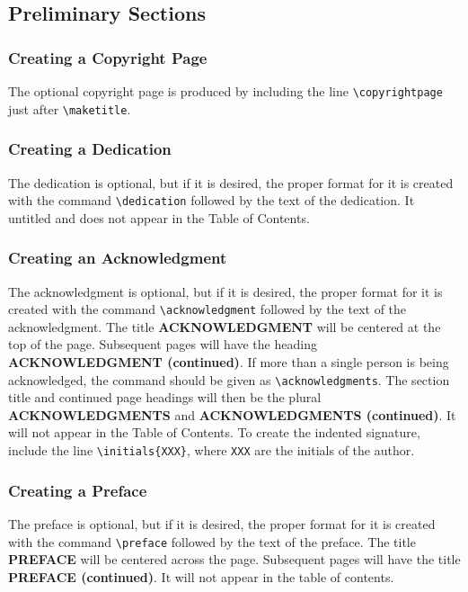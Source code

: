 \subsection{Preliminary Sections}
\subsubsection{Creating a Copyright Page}
The optional copyright page is produced by including the line
\verb+\copyrightpage+ just after \verb+\maketitle+.
 
\subsubsection{Creating a Dedication}
The dedication is optional, but if it is desired, the proper format for
it is created with the command \verb+\dedication+ followed by the
text of the dedication.
It untitled and does not appear in the Table of Contents.
 
\subsubsection{Creating an Acknowledgment}
The acknowledgment is optional, but if it is desired, the
proper format for it is created with the command \verb+\acknowledgment+
followed by the text of the acknowledgment.
The title {\bf ACKNOWLEDGMENT} will be centered at the top of the page.
Subsequent pages will have the heading {\bf ACKNOWLEDGMENT (continued)}.
If more than a single person is being acknowledged, the command should
be given as \verb+\acknowledgments+.  The section title and continued
page headings will then be the plural {\bf ACKNOWLEDGMENTS} and
{\bf ACKNOWLEDGMENTS (continued)}.
It will not appear in the Table of Contents.
To create the indented signature, include the line
\verb+\initials{XXX}+, where \verb+XXX+ are the initials of the author.
 
\subsubsection{Creating a Preface}
The preface is optional, but if it is desired, the
proper format for it is created with the command \verb+\preface+
followed by the text of the preface.
The title {\bf PREFACE} will be centered across the page.
Subsequent pages will have the title {\bf PREFACE (continued)}.
It will not appear in the table of contents.
 
